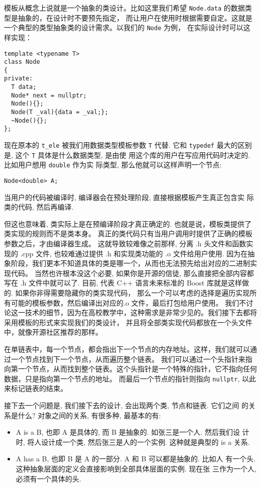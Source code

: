 \documentclass[a4paper]{ctexart}
\theoremstyle{definition}
\theoremstyle{definition}
\begin{document}
模板从概念上说就是一个抽象的类设计。比如这里我们希望 \verb|Node.data| 的数据类型是抽象的，在设计时不要预先指定，
而让用户在使用时根据需要自定。这就是一个典型的类型抽象类的设计需求。以我们的 \verb|Node| 为例，
在实际设计时可以这样实现：
\begin{verbatim}
template <typename T>
class Node
{
private:
  T data;
  Node* next = nullptr; 
  Node(){};
  Node(T _val){data = _val;};
  ~Node(){};
};
\end{verbatim}
现在原本的 \verb|t_ele| 被我们用数据类型模板参数 \verb|T| 代替. 它和
\verb|typedef| 最大的区别是, 这个 \verb|T| 具体是什么数据类型, 是由使
用这个库的用户在写应用代码时决定的. 比如用户想用 \verb|double| 作为实
际类型, 那么他就可以这样声明一个节点:
\begin{verbatim}
Node<double> A;
\end{verbatim}
当用户的代码被编译时, 编译器会在预处理阶段, 直接根据模板产生真正包含实
际类的代码, 然后再编译. 

但这也意味着, 类实际上是在预编译阶段才真正确定的. 也就是说，模板类提供了类实现的规则而不是类本身。
真正的类代码只有当用户调用时提供了正确的模板参数之后，才由编译器生成。
这就导致较难像之前那样, 分离 .h 头文件和函数实现的 .cpp 文件, 也较难通过提供 .h 和实现类功能的
.o 文件给用户使用. 因为在抽象阶段，我们更本不知道具体的类是哪一个，从而也无法预先给出对应的二进制实现代码。
当然也许根本没这个必要, 如果你是开源的信徒, 那么直接把全部内容都写在 .h 文件中就可以了. 
目前, 代表 C++ 语言未来标准的 Boost 库就是这样做的. 如果你非得需要隐藏你的类实现代码，
那么一个可以考虑的选择是遍历实现所有可能的模板参数，然后编译出对应的.o 文件，最后打包给用户使用。
我们不讨论这一技术的细节，因为在高校教学中，这种需求是非常少见的。我们接下去都将采用模板的形式来实现我们的类设计，
并且将全部类实现代码都放在一个头文件中，就像开源社区推荐的那样。

在单链表中，每一个节点，都会指出下一个节点的内存地址。这样，我们就可以通过一个节点找到下一个节点，从而遍历整个链表。
我们可以通过一个头指针来指向第一个节点，从而找到整个链表。这个头指针是一个特殊的指针，它不指向任何数据，只是指向第一个节点的地址。
而最后一个节点的指针则指向 \verb|nullptr|, 以此来标记链表的结束。

接下去一个问题是, 我们接下去的设计, 会出现两个类, 节点和链表. 它们之间
的关系是什么? 对象之间的关系, 有很多种, 最基本的有:
\begin{itemize}
  \item A is a B, 也即 A 是具体的, 而 B 是抽象的. 如张三是一个人. 然后我们设
  计时, 将人设计成一个类, 然后张三是人的一个实例. 这种就是典型的 is a 关系.
  \item A has a B, 也即 B 是 A 的一部分. A 和 B 可以都是抽象的. 比如人
    有一个头. 这种抽象层面的定义会直接影响到全部具体层面的实例. 现在张
    三作为一个人, 必须有一个具体的头. 
\end{itemize}
\end{document}
